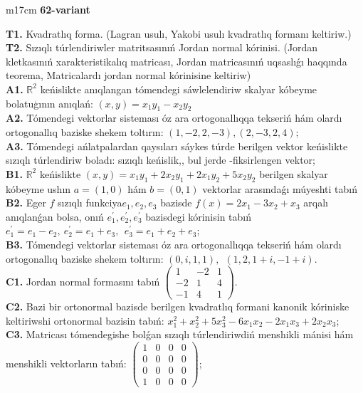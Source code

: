 \documentclass{article}
\begin{document}
\begin{tabular}{m{17cm}}
\textbf{62-variant}
\newline

\textbf{T1.} Kvadratlıq forma. (Lagran usulı, Yakobi usulı kvadratlıq formanı keltiriw.) \\
\textbf{T2.} Sızıqlı túrlendiriwler matritsasınıń Jordan normal kórinisi. (Jordan kletkasınıń xarakteristikalıq matricası, Jordan matricasınıń uqsaslıǵı haqqında teorema,  Matricalardı jordan normal kórinisine keltiriw) \\
\textbf{A1.} \(\mathbb{R}^{2}\) keńislikte anıqlangan tómendegi sáwlelendiriw skalyar kóbeyme bolatuģının anıqlań: \((x,y) = x_{1}y_{1} - x_{2}y_{2}\) \\
\textbf{A2.} Tómendegi vektorlar sisteması óz ara ortogonallıqqa tekseriń hám olardı ortogonallıq baziske shekem toltırın: \((1, - 2,2, - 3),(2, - 3,2,4)\); \\
\textbf{A3.} Tómendegi ańlatpalardan qaysıları sáykes túrde berilgen vektor keńislikte sızıqlı túrlendiriw boladı: sızıqlı keńislik,, bul jerde -fiksirlengen vektor; \\
\textbf{B1.} \(\mathbb{R}^{2}\) keńislikte \((x,y) = x_{1}y_{1} + 2x_{2}y_{1} + 2x_{1}y_{2} + 5x_{2}y_{2}\) berilgen skalyar kóbeyme ushın \(a = (1,0)\) hám \(b = (0,1)\) vektorlar arasındaǵı múyeshti tabıń \\
\textbf{B2.} Eger \(f\) sızıqlı funkciya\(e_{1},e_{2},e_{3}\) bazisde \(f(x) = 2x_{1} - 3x_{2} + x_{3}\) arqalı anıqlanǵan bolsa, onıń \(e_{1}^{'},e_{2}^{'},e_{3}^{'}\) bazisdegi kórinisin tabıń\(e_{1}^{'} = e_{1} - e_{2},\ e_{2}^{'} = e_{1} + e_{3},\ \ e_{3}^{'} = e_{1} + e_{2} + e_{3}\); \\
\textbf{B3.} Tómendegi vektorlar sisteması óz ara ortogonallıqqa tekseriń hám olardı ortogonallıq baziske shekem toltırın: \((0,i,1,1),\ \ (1,2,1 + i, - 1 + i)\). \\
\textbf{C1.} Jordan normal formasını tabıń \(\begin{pmatrix} 1 & - 2 & 1 \\  - 2 & 1 & 4 \\  - 1 & 4 & 1 \end{pmatrix}\). \\
\textbf{C2.} Bazi bir ortonormal bazisde berilgen kvadratlıq formani kanonik kóriniske keltiriwshi ortonormal bazisin tabıń: \(x_{1}^{2} + x_{2}^{2} + 5x_{3}^{2} - 6x_{1}x_{2} - 2x_{1}x_{3} + 2x_{2}x_{3}\); \\
\textbf{C3.} Matricası tómendegishe bolǵan sızıqlı túrlendiriwdiń menshikli mánisi hám menshikli vektorların tabıń: \(\begin{pmatrix} 1 & 0 & 0 & 0 \\ 0 & 0 & 0 & 0 \\ 0 & 0 & 0 & 0 \\ 1 & 0 & 0 & 0 \end{pmatrix}\); \\

\end{tabular}
\vspace{1cm}
\end{document}
